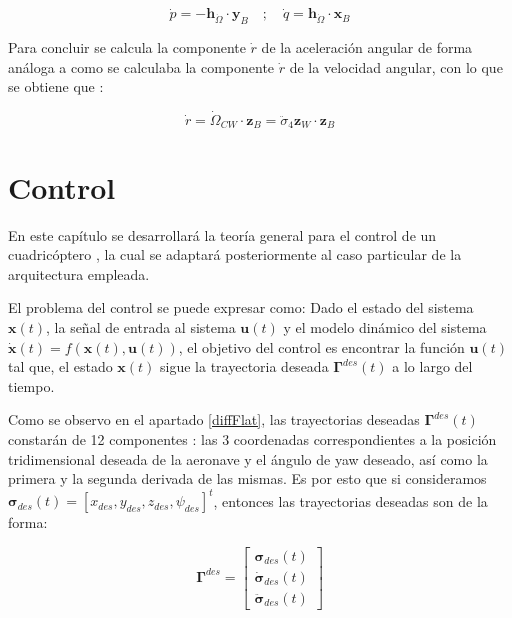 \begin{equation}
	\dot p = -\textbf{h}_{\dot \Omega} \cdot \mathbf{y}_B \quad;\quad \dot q = \textbf{h}_{\dot \Omega}  \cdot \mathbf{x}_B
\end{equation}

Para concluir se calcula la componente $\dot{r}$ de la aceleración angular de forma análoga a como se calculaba la componente $\dot{r}$ de la velocidad angular, con lo que se obtiene que :

\begin{equation}
	 \dot r = \dot\Omega_{CW} \cdot \mathbf{z}_B =  \ddot \sigma_4 \mathbf{z}_W \cdot \mathbf{z}_B
	\end{equation}


\chapter{Control}
En este capítulo se desarrollará la teoría general para el control de un cuadricóptero \cite{MinimunSnap2011}\cite{mahony2012multirotor}\cite{amir2008modeling}\cite{mellinger2012trajectory}, la cual se adaptará posteriormente al caso particular de la arquitectura empleada.

El problema del control se puede expresar como: 
Dado el estado del sistema $\mathbf{x}(t)$, la señal de entrada al sistema $\mathbf{u}(t)$ y el modelo dinámico del sistema $ \mathbf{\dot x}(t) = f(\mathbf{x}(t),\mathbf{u}(t))$, el objetivo del control es encontrar la función $\mathbf{u}(t)$ tal que, el estado $\mathbf{x}(t)$ sigue la trayectoria deseada $\mathbf{\Gamma}^{des}(t)$ a lo largo del tiempo.

 Como se observo en el apartado \ref{diffFlat}, las trayectorias deseadas $\mathbf{\Gamma}^{des}(t)$ constarán de 12 componentes : las 3 coordenadas correspondientes a la posición tridimensional deseada de la aeronave y el ángulo de yaw deseado, así como la primera y la segunda derivada de las mismas. Es por esto que si consideramos $\mathbf{\sigma}_{des}(t) = [x_{des},y_{des},z_{des}, \psi_{des}]^t$, entonces las trayectorias deseadas son de la forma:
 
 \begin{equation}
 	\mathbf{\Gamma}^{des} = \begin{bmatrix}
 		\mathbf{\sigma}_{des}(t)\\
 		\mathbf{\dot \sigma}_{des}(t)\\
 		\mathbf{\ddot \sigma}_{des}(t)
 	\end{bmatrix}
 \end{equation}


